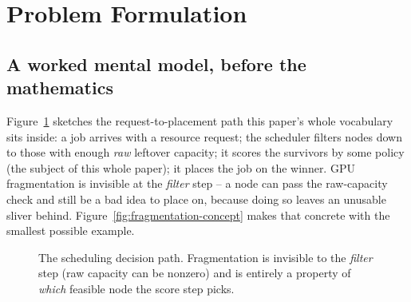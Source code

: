 \documentclass[11pt]{article}
\begin{document}
\section{Problem Formulation}

\subsection{A worked mental model, before the mathematics}
Figure~\ref{fig:k8s-flow} sketches the request-to-placement path this
paper's whole vocabulary sits inside: a job arrives with a resource
request; the scheduler filters nodes down to those with enough
\emph{raw} leftover capacity; it scores the survivors by some policy
(the subject of this whole paper); it places the job on the winner. GPU
fragmentation is invisible at the \emph{filter} step -- a node can pass the
raw-capacity check and still be a bad idea to place on, because doing so
leaves an unusable sliver behind. Figure~\ref{fig:fragmentation-concept}
makes that concrete with the smallest possible example.

\begin{figure}[h]
\centering
{}
\caption{The scheduling decision path. Fragmentation is invisible to the
\emph{filter} step (raw capacity can be nonzero) and is entirely a
property of \emph{which} feasible node the score step picks.}
\label{fig:k8s-flow}
\end{figure}
\end{document}
